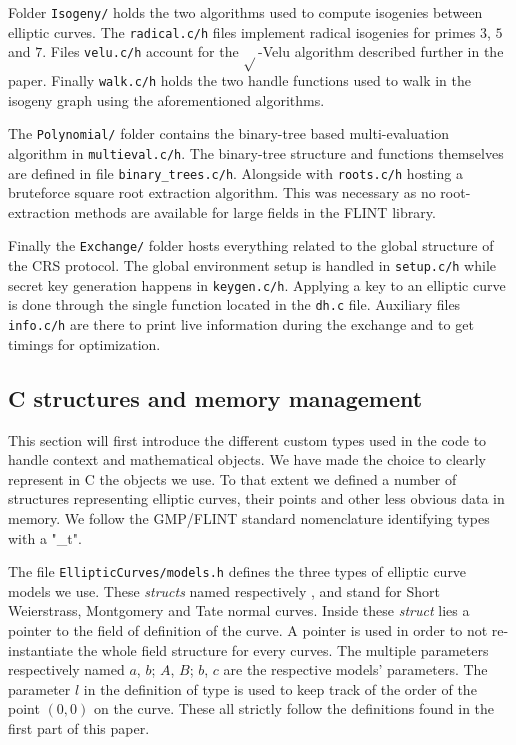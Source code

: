 \documentclass[../main.tex]{subfilesubs}
\begin{document}
Folder \texttt{Isogeny/} holds the two algorithms used to compute isogenies between elliptic curves.
The \texttt{radical.c/h} files implement radical isogenies for primes $3$, $5$ and $7$.
Files \texttt{velu.c/h} account for the $\sqrt{}$-Velu algorithm described further in the paper.
Finally \texttt{walk.c/h} holds the two handle functions used to walk in the isogeny graph using the aforementioned algorithms.

The \texttt{Polynomial/} folder contains the binary-tree based multi-evaluation algorithm in \texttt{multieval.c/h}.
The binary-tree structure and functions themselves are defined in file \texttt{binary\_trees.c/h}.
Alongside with \texttt{roots.c/h} hosting a bruteforce square root extraction algorithm.
This was necessary as no root-extraction methods are available for large fields in the FLINT library.

Finally the \texttt{Exchange/} folder hosts everything related to the global structure of the CRS protocol.
The global environment setup is handled in \texttt{setup.c/h} while secret key generation happens in \texttt{keygen.c/h}.
Applying a key to an elliptic curve is done through the single function located in the \texttt{dh.c} file.
Auxiliary files \texttt{info.c/h} are there to print live information during the exchange  and to get timings for optimization.


\subsection{C structures and memory management}
This section will first introduce the different custom types used in the code to handle context and mathematical objects.
We have made the choice to clearly represent in C the objects we use.
To that extent we defined a number of structures representing elliptic curves, their points and other less obvious data in memory.
We follow the GMP/FLINT standard nomenclature identifying types with a "\_t".

The file \texttt{EllipticCurves/models.h} defines the three types of elliptic curve models we use.
These \textit{structs} named respectively ,  and  stand for Short Weierstrass, Montgomery and Tate normal curves.
Inside these \textit{struct} lies a  pointer to the field of definition of the curve.
A pointer is used in order to not re-instantiate the whole field structure for every curves.
The multiple  parameters respectively named $a$, $b$; $A$, $B$; $b$, $c$ are the respective models' parameters.
The  parameter $l$ in the definition of type  is used to keep track of the order of the point $(0, 0)$ on the curve.
These all strictly follow the definitions found in the first part of this paper.
\end{document}
